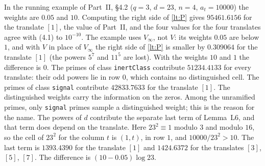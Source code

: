 \documentclass[11pt,letterpaper]{article}
\begin{document}
\noindent In the running example of Part~II, \S4.2 ($q=3$, $d=23$, $n=4$, $a_t=10000$) the weights are
$0.05$ and $10$. Computing the right side of \eqref{lt:P} gives $95461.6156$ for the translate $[1]$, the
value of Part~II, and the four values for the four translates agree with (4.1) to $10^{-10}$. The example
uses $V_\infty$, not $V$: its weights $0.05$ are below $1$, and with $V$ in place of $V_\infty$ the right
side of \eqref{lt:P} is smaller by $0.309064$ for the translate $[1]$ (the powers $5^7$ and $11^5$ are
lost). With the weights $10$ and $1$ the difference is $0$. The primes of class \texttt{inertClass}
contribute $51234.4133$ for every translate: their odd powers lie in row $0$, which contains no
distinguished cell. The primes of class \texttt{signal} contribute $42833.7633$ for the translate $[1]$.
The distinguished weights carry the information on the zeros. Among the unramified primes, only
\texttt{signal} primes sample a distinguished weight; this is the reason for the name. The powers of $d$
contribute the separate last term of Lemma~L6, and that term does depend on the translate. Here
$23^2\equiv1$ modulo $3$ and modulo $16$, so the cell of $23^2$ for the column $t$ is $(1,t)$, in row $1$,
and $10000/23^2>10$. The last term is $1393.4390$ for the translate $[1]$ and $1424.6372$ for the
translates $[3]$, $[5]$, $[7]$. The difference is $(10-0.05)\log23$.
\end{document}
